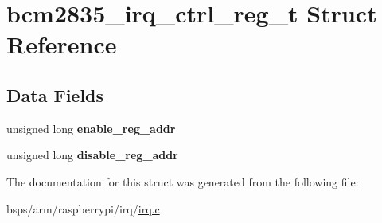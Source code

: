 \hypertarget{structbcm2835__irq__ctrl__reg__t}{}\section{bcm2835\+\_\+irq\+\_\+ctrl\+\_\+reg\+\_\+t Struct Reference}
\label{structbcm2835__irq__ctrl__reg__t}
\subsection*{Data Fields}
\begin{DoxyCompactItemize}
\item 
\mbox{\label{structbcm2835__irq__ctrl__reg__t_a75c15056147bf8a99e0611007cabade6}} 
unsigned long {\bfseries enable\+\_\+reg\+\_\+addr}
\item 
\mbox{\label{structbcm2835__irq__ctrl__reg__t_a50e9f795c718898ee103d53cd24b656a}} 
unsigned long {\bfseries disable\+\_\+reg\+\_\+addr}
\end{DoxyCompactItemize}


The documentation for this struct was generated from the following file\+:\begin{DoxyCompactItemize}
\item 
bsps/arm/raspberrypi/irq/\mbox{\hyperlink{bsps_2arm_2raspberrypi_2irq_2irq_8c}{irq.\+c}}\end{DoxyCompactItemize}
